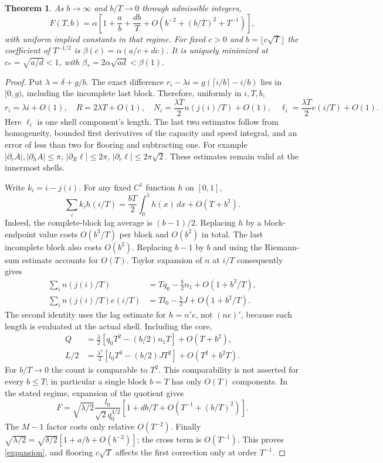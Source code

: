 \documentclass[11pt]{article}
\newtheorem{theorem}{Theorem}
\begin{document}
\begin{theorem}\label{correction}
As $b\to\infty$ and $b/T\to0$ through admissible integers,
\begin{equation}\label{expansion}
F(T,b)=\alpha\left[1+\frac{a}{b}+\frac{db}{T}
 +O\left(b^{-2}+(b/T)^2+T^{-1}\right)\right],
\end{equation}
with uniform implied constants in that regime. For fixed $c>0$ and
$b=\lfloor c\sqrt T\rfloor$ the coefficient of $T^{-1/2}$ is
$\beta(c)=\alpha(a/c+dc)$. It is uniquely minimized at $c_* =\sqrt{a/d}<1$,
with $\beta_*=2\alpha\sqrt{ad}<\beta(1)$.
\end{theorem}
\begin{proof}
Put $\lambda=\delta+g/b$. The exact difference
$r_i-\lambda i=g(\lceil i/b\rceil-i/b)$ lies in $[0,g)$, including the
incomplete last block. Therefore, uniformly in $i,T,b$,
\[
r_i=\lambda i+O(1),\quad R=2\lambda T+O(1),\quad
N_i=\frac{\lambda T}{2}n(j(i)/T)+O(1),\quad
\ell_i=\frac{\lambda T}{2}e(i/T)+O(1).
\]
Here $\ell_i$ is one shell component's length. The last two estimates follow
from homogeneity, bounded first derivatives of the capacity and speed
integral, and an error of less than two for flooring and subtracting one.
For example $|\partial_r A|,|\partial_h A|\le\pi$,
$|\partial_R\ell|\le2\pi$, $|\partial_r\ell|\le2\pi\sqrt2$.
These estimates remain valid at the innermost shells.

Write $k_i=i-j(i)$. For any fixed $C^1$ function $h$ on $[0,1]$,
\[
\sum_i k_i h(i/T)=\frac{bT}{2}\int_0^1h(x)\,dx+O(T+b^2).
\]
Indeed, the complete-block lag average is $(b-1)/2$. Replacing $h$ by a
block-endpoint value costs $O(b^3/T)$ per block and $O(b^2)$ in total.
The last incomplete block also costs $O(b^2)$. Replacing $b-1$ by $b$
and using the Riemann-sum estimate accounts for $O(T)$.
Taylor expansion of $n$ at $i/T$ consequently gives
\begin{align*}
\sum_i n(j(i)/T)&=Tq_0-\frac b2 n_1+O(1+b^2/T),\\
\sum_i n(j(i)/T)e(i/T)&=Tl_0-\frac b2 J+O(1+b^2/T).
\end{align*}
The second identity uses the lag estimate for $h=n'e$, not $(ne)'$,
because each length is evaluated at the actual shell. Including the core,
\begin{align*}
Q&=\frac\lambda2[q_0T^2-(b/2)n_1T]+O(T+b^2),\\
L/2&=\frac{\lambda^2}{4}[l_0T^3-(b/2)JT^2]+O(T^2+b^2T).
\end{align*}
For $b/T\to0$ the count is comparable to $T^2$. This comparability is not
asserted for every $b\le T$; in particular a single block $b=T$ has only
$O(T)$ components. In the stated regime, expansion of the quotient gives
\[
F=\sqrt{\lambda/2}\frac{l_0}{\sqrt2q_0^{3/2}}
 [1+d b/T+O(T^{-1}+(b/T)^2)].
\]
The $M-1$ factor costs only relative $O(T^{-2})$.
Finally $\sqrt{\lambda/2}=\sqrt{\delta/2}[1+a/b+O(b^{-2})]$;
the cross term is $O(T^{-1})$. This proves \eqref{expansion}, and flooring
$c\sqrt T$ affects the first correction only at order $T^{-1}$.


\end{proof}
\end{document}
